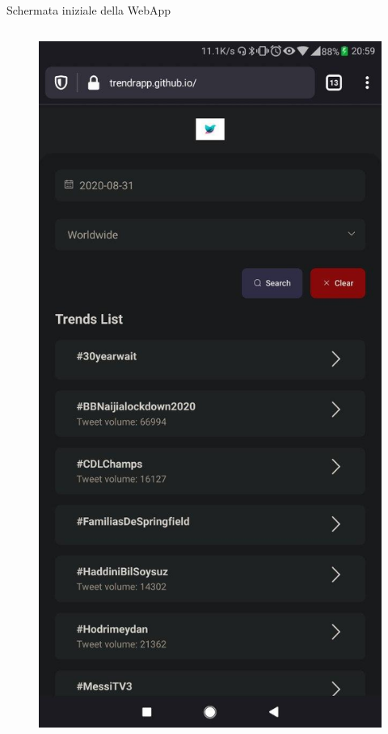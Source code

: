 \documentclass[xcolor=svgnames, aspectratio=169]{beamer}
\begin{document}
\begin{frame}{Schermata iniziale della WebApp}
\begin{columns}[t]
\begin{figure}[H]
            \includegraphics[width=0.75\paperwidth,height=0.75\paperheight,keepaspectratio]{Mobile_Firefox_Schermata_di_default.jpg}
        \end{figure}
    \end{columns}
\end{frame}
\end{document}

